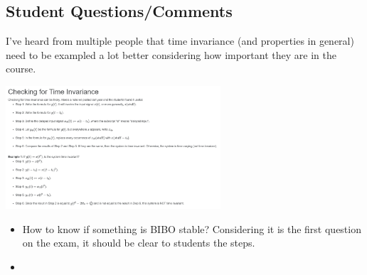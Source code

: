 \subsection{Student Questions/Comments}
\begin{example}
I've heard from multiple people that time invariance (and properties in general) need to be exampled a lot better considering how important they are in the course.
\begin{center}
    \includegraphics[width = 0.6\textwidth]{images/checking_for_time_invariance.png}       
\end{center}
\end{example}

\begin{itemize}
    \item How to know if something is BIBO stable? Considering it is the first question on the exam, it should be clear to students the steps.
    \item 
\end{itemize}

